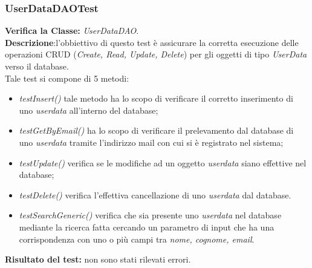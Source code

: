 \subsubsection{UserDataDAOTest}
\textbf{Verifica la Classe:} \textit{UserDataDAO}.\\
\textbf{Descrizione}:l'obbiettivo di questo test è assicurare la corretta esecuzione delle operazioni CRUD (\textit{Create, Read, Update, Delete}) per gli oggetti di tipo \textit{UserData} verso il database. \\
Tale test si compone di 5 metodi:
\begin{itemize}
\item \textit{testInsert()} tale metodo ha lo scopo di verificare il corretto inserimento di uno \textit{userdata} all'interno del database;
\item \textit{testGetByEmail()} ha lo scopo di verificare il prelevamento dal database di uno \textit{userdata} tramite l'indirizzo mail con cui si è registrato nel sistema;
\item \textit{testUpdate() } verifica se le modifiche ad un oggetto \textit{userdata} siano effettive nel database;
\item \textit{testDelete() } verifica l'effettiva cancellazione di uno \textit{userdata} dal database.
\item \textit{testSearchGeneric()} verifica che sia presente uno \textit{userdata} nel database mediante la ricerca fatta cercando un parametro di input che ha una corrispondenza con uno o più campi tra \textit{nome, cognome, email}.
\end{itemize}
\textbf{Risultato del test:} non sono stati rilevati errori.

